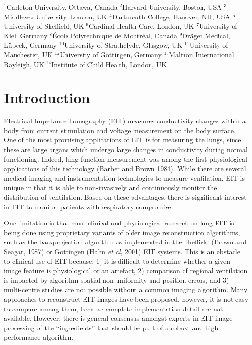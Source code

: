 \documentclass[letterpaper,twocolumn,10pt]{article}
\newcommand{\etal}{{\em et al}}
\begin{document}

{\small
\noindent 
 $^{1}$Carleton University, Ottawa, Canada
 $^{2}$Harvard University, Boston, USA
 $^{3}$Middlesex University, London, UK
 $^{4}$Dartmouth College, Hanover, NH, USA
 $^{5}$University of Sheffield, UK
 $^{6}$Cardinal Health Care, London, UK
 $^{7}$University of Kiel, Germany
 $^{8}$\'Ecole Polytechnique de Montr\'eal, Canada
 $^{9}$Dr\"ager Medical, L\"ubeck, Germany
$^{10}$University of Strathclyde, Glasgow, UK
$^{11}$University of Manchester, UK
$^{12}$University of G\"ottingen, Germany
$^{13}$Maltron International, Rayleigh, UK
$^{14}$Institute of Child Health, London, UK
}

\section{Introduction}
Electrical Impedance Tomography (EIT) measures conductivity
changes within a body from current stimulation and voltage
measurement on the body surface. One of the most promising
applications of EIT is for measuring the lungs, since these
are large organs which undergo large changes in conductivity
during normal functioning. Indeed, lung function measurement
was among the first physiological applications of this technology
(Barber and Brown 1984).
While there are several medical imaging and instrumentation
technologies to measure ventilation, EIT is unique in that it
is able to non-invasively and continuously monitor the distribution of 
ventilation. Based on these advantages, there is significant
interest in EIT to 
monitor patients with respiratory compromise.

One limitation is that most clinical and physiological research
on lung EIT is being done using proprietary variants of
older image reconstruction algorithms, such as the backprojection
algorithm as implemented
in the Sheffield (Brown and Seagar, 1987)
or G\"ottingen (Hahn \etal, 2001) EIT systems.
This is an obstacle to clinical use of EIT because:
1) it is difficult to determine whether a given image feature is 
physiological or an artefact,
2) comparison of regional ventilation is impacted by
algorithm spatial non-uniformity and position errors,
and 
3) multi-centre studies are not possible without a 
common imaging algorithm.
Many approaches to reconstruct EIT images have been proposed,
however, it is not easy to compare among them, because 
complete implementation detail are not available.
However, there is general consensus amongst experts
in EIT image processing of the ``ingredients'' that should
be part of a robust and high performance algorithm.
\end{document}
